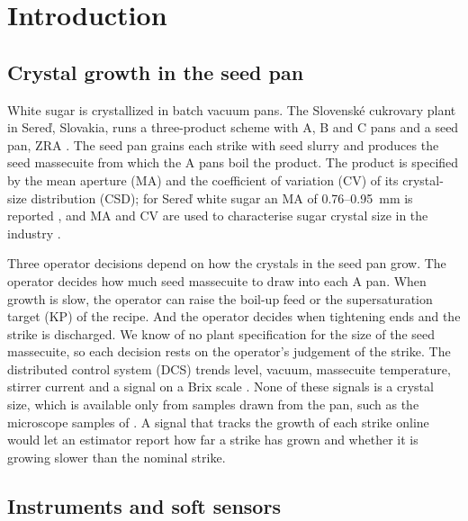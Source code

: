 \section{Introduction}\label{sec:intro}

\subsection{Crystal growth in the seed pan}\label{sec:intro-need}

White sugar is crystallized in batch vacuum pans. The Slovensk\'e cukrovary plant in Sere\v{d}, Slovakia, runs a
three-product scheme with A, B and C pans and a seed pan, ZRA \citep{SlovenskeCukrovary2026}. The seed pan grains
each strike with seed slurry and produces the seed massecuite from which the A pans boil the product. The product
is specified by the mean aperture (MA) and the coefficient of variation (CV) of its crystal-size distribution (CSD);
for Sere\v{d} white sugar an MA of 0.76--0.95~mm is reported \citep{Bennar2010}, and MA and CV are used to
characterise sugar crystal size in the industry \citep{Daniels2017}.

Three operator decisions depend on how the crystals in the seed pan grow. The operator decides how much seed
massecuite to draw into each A pan. When growth is slow, the operator can raise the boil-up feed or the
supersaturation target (KP) of the recipe. And the operator decides when tightening ends and the strike is
discharged. We know of no plant specification for the size of the seed massecuite, so each decision rests on the
operator's judgement of the strike. The distributed control system (DCS) trends level, vacuum, massecuite
temperature, stirrer current and a signal on a Brix scale \citep{SlovenskeCukrovary2026}. None of these signals is a
crystal size, which is available only from samples drawn from the pan, such as the microscope samples of
. A signal that tracks the
growth of each strike online would let an estimator report how far a strike has grown and whether it is growing
slower than the nominal strike.

\subsection{Instruments and soft sensors}\label{sec:intro-instruments}

